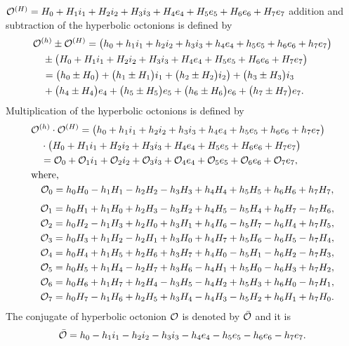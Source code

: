 ${{\mathcal{O}}}^{(H)}=H_0+H_1i_1+H_2i_2+H_3i_3+H_4e_4+H_5e_5+H_6e_6+H_7e_7$ addition and subtraction of the hyperbolic octonions is defined by
\begin{align*}
&{{\mathcal{O}}}^{(h)}\pm {{\mathcal{O}}}^{(H)}=\big(h_0+h_1i_1+h_2i_2+h_3i_3+h_4e_4+h_5e_5+h_6e_6+h_7e_7\big)\\&\quad \pm \big( H_0+H_1i_1+H_2i_2+H_3i_3+H_4e_4+H_5e_5+H_6e_6+H_7e_7\big)\\
&\quad =\big(h_0\pm H_0\big)+\big(h_1\pm H_1\big)i_1+\big(h_2\pm H_2\big)i_2\big)+\big(h_3\pm H_3\big)i_3\\&\quad +\big(h_4\pm H_4\big)e_4+\big(h_5\pm H_5\big)e_5+\big(h_6\pm H_6\big)e_6+\big(h_7\pm H_7\big)e_7.
\end{align*}
Multiplication of the hyperbolic octonions is defined by
\begin{align*}
&{{\mathcal{O}}}^{(h)}\cdot{{\mathcal{O}}}^{(H)}=\big(h_0+h_1i_1+h_2i_2+h_3i_3+h_4e_4+h_5e_5+h_6e_6+h_7e_7\big)\\&\quad \cdot \big( H_0+H_1i_1+H_2i_2+H_3i_3+H_4e_4+H_5e_5+H_6e_6+H_7e_7\big)\\
&\quad ={{\mathcal{O}}}_{0}+{{\mathcal{O}}}_1i_1+{{\mathcal{O}}}_2i_2+{{\mathcal{O}}}_3i_3+{{\mathcal{O}}}_4e_4+{{\mathcal{O}}}_5e_5+{{\mathcal{O}}}_6e_6+{{\mathcal{O}}}_7e_7,\\
&\text{where,}\\
& \quad {{\mathcal{O}}}_0 = h_0H_0 - h_1H_1 - h_2H_2 - h_3H_3 + h_4H_4 + h_5H_5 + h_6H_6 + h_7H_7,\\
\end{align*}
\begin{align*}
& \quad {{\mathcal{O}}}_1 = h_0H_1 + h_1H_0 + h_2H_3 - h_3H_2 + h_4H_5 - h_5H_4 + h_6H_7 - h_7H_6,\\
& \quad {{\mathcal{O}}}_2 = h_0H_2 - h_1H_3 + h_2H_0 + h_3H_1 + h_4H_6 - h_5H_7 - h_6H_4 + h_7H_5,\\
& \quad {{\mathcal{O}}}_3 = h_0H_3 + h_1H_2 - h_2H_1 + h_3H_0 + h_4H_7 + h_5H_6 - h_6H_5 - h_7H_4,\\
& \quad {{\mathcal{O}}}_4 = h_0H_4 + h_1H_5 + h_2H_6 + h_3H_7 + h_4H_0 - h_5H_1 - h_6H_2 - h_7H_3,\\
& \quad {{\mathcal{O}}}_5 = h_0H_5 + h_1H_4 - h_2H_7 + h_3H_6 - h_4H_1 + h_5H_0 - h_6H_3 + h_7H_2,\\
& \quad {{\mathcal{O}}}_6 = h_0H_6 + h_1H_7 + h_2H_4 - h_3H_5 - h_4H_2 + h_5H_3 + h_6H_0 - h_7H_1,\\
& \quad {{\mathcal{O}}}_7 = h_0H_7 - h_1H_6 + h_2H_5 + h_3H_4 - h_4H_3 - h_5H_2 + h_6H_1 + h_7H_0.
\end{align*}
The conjugate of hyperbolic octonion ${{\mathcal{O}}}$ is denoted by $\bar{{{\mathcal{O}}}}$ and it is
\begin{align*}
\bar{{{\mathcal{O}}}}=h_0-h_1i_1-h_2i_2-h_3i_3-h_4e_4-h_5e_5-h_6e_6-h_7e_7.
\end{align*}
